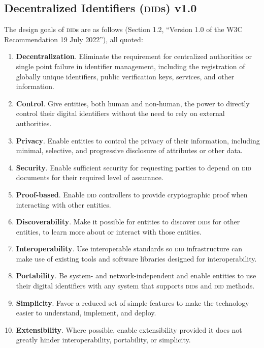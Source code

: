 \documentclass[twoside]{article}
\begin{document}
\subsection{Decentralized Identifiers (\textsc{did}s) v1.0}

The design goals of \textsc{did}s are as follows (Section 1.2, ``Version 1.0 of the W3C Recommendation 19 July 2022''), all quoted:

\begin{enumerate}
  \item  \sloppy \textbf{Decentralization}. Eliminate the requirement for centralized authorities or single point failure in identifier management, including the registration of globally unique identifiers, public verification keys, services, and other information.
  \item  \textbf{Control}. Give entities, both human and non-human, the power to directly control their digital identifiers without the need to rely on external authorities.
  \item  \textbf{Privacy}. Enable entities to control the privacy of their information, including minimal, selective, and progressive disclosure of attributes or other data.
  \item  \textbf{Security}. Enable sufficient security for requesting parties to depend on \textsc{did} documents for their required level of assurance.
  \item  \textbf{Proof-based}. Enable \textsc{did} controllers to provide cryptographic proof when interacting with other entities.
  \item  \textbf{Discoverability}. Make it possible for entities to discover \textsc{did}s for other entities, to learn more about or interact with those entities.
  \item  \textbf{Interoperability}. Use interoperable standards so \textsc{did} infrastructure can make use of existing tools and software libraries designed for interoperability.
  \item  \textbf{Portability}. Be system- and network-independent and enable entities to use their digital identifiers with any system that supports \textsc{did}s and \textsc{did} methods.
  \item  \textbf{Simplicity}. Favor a reduced set of simple features to make the technology easier to understand, implement, and deploy.
  \item  \textbf{Extensibility}. Where possible, enable extensibility provided it does not greatly hinder interoperability, portability, or simplicity.
\end{enumerate}

\printbibliography
\end{document}
